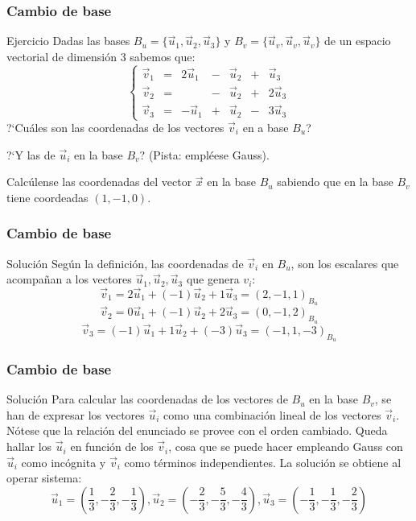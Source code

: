 \documentclass{beamer}
\begin{document}
 \begin{frame}
  \frametitle{Cambio de base}
\begin{block}{Ejercicio}
Dadas las bases $B_u=\{\vec u_1,\vec u_2,\vec u_3\}$ y $B_v=\{\vec u_v,\vec u_v,\vec u_v\}$ de un espacio vectorial de dimensi\'on 3 sabemos que:
\[\left\{\begin{array}{ccccccc}\vec v_1 & = & 2\vec u_1 & - & \vec u_2 & + & \vec u_3 \\\vec v_2 & = &  & - & \vec u_2 & + & 2\vec u_3 \\\vec v_3 & = & -\vec u_1 & + & \vec u_2 & - & 3\vec u_3\end{array}\right.\]
?`Cu\'ales son las coordenadas de los vectores $\vec v_i$ en a base $B_{u}$? 

?`Y las de $\vec u_i$ en la base $B_v$? (Pista: empl\'eese Gauss). 

Calc\'ulense las coordenadas del vector $\vec x$ en la base $B_u$ sabiendo que en la base $B_v$ tiene coordeadas $(1,-1,0)$.
\end{block}
\end{frame}




\begin{frame}
  \frametitle{Cambio de base}
\begin{block}{Soluci\'on}
Seg\'un la definici\'on, las coordenadas de $\vec v_i $ en $B_u$, son los escalares que acompa\~nan a los vectores $\vec u_1, \vec u_2, \vec u_3$ que genera $v_i$:
\[\vec v_1 = 2\vec u_1 +(-1)\vec u_2 +1\vec u_3 = (2,-1,1)_{B_u}\]
\[\vec v_2 = 0\vec u_1 +(-1)\vec u_2 +2\vec u_3 = (0,-1,2)_{B_u}\]
\[\vec v_3 = (-1)\vec u_1 +1\vec u_2 +(-3)\vec u_3 = (-1,1,-3)_{B_u}\]
\end{block}
\end{frame}



\begin{frame}
  \frametitle{Cambio de base}
\begin{block}{Soluci\'on}
Para calcular las coordenadas de los vectores de $B_u$ en la base $B_v$, se han de expresar los vectores $\vec u_i$ como una combinaci\'on lineal de los vectores $\vec v_i$. N\'otese que la relaci\'on del enunciado se provee con el orden cambiado. Queda hallar los $\vec u_i$ en funci\'on de los $\vec v_i$, cosa que se puede hacer empleando Gauss con $\vec u_i$ como inc\'ognita y $\vec v_i$ como t\'erminos independientes. La soluci\'on se obtiene al operar sistema:
\[\vec u_1 = \left( \frac{1}{3}, - \frac{2}{3}, -\frac{1}{3}\right),
\vec u_2 = \left( -\frac{2}{3}, - \frac{5}{3}, -\frac{4}{3}\right),
\vec u_3 = \left( -\frac{1}{3}, - \frac{1}{3}, -\frac{2}{3}\right)\]
\end{block}
\end{frame}
\end{document}
